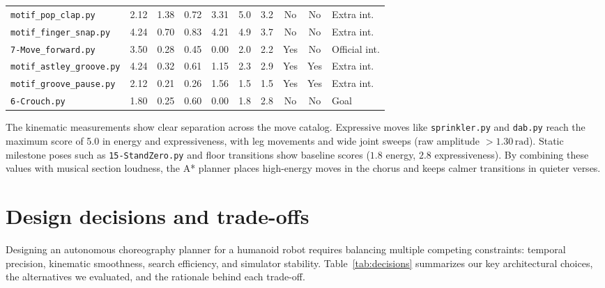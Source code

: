\documentclass[11pt,a4paper]{article}
\newcommand{\code}[1]{\texttt{#1}}
\begin{document}
\begin{table}[H]
\begin{tabular}{l r r r r r r c c l}
    \code{motif\_pop\_clap.py}     &  2.12 & 1.38 & 0.72 & 3.31 & 5.0 & 3.2 & No  & No  & Extra int. \\
    \code{motif\_finger\_snap.py}  &  4.24 & 0.70 & 0.83 & 4.21 & 4.9 & 3.7 & No  & No  & Extra int. \\
    \code{7-Move\_forward.py}      &  3.50 & 0.28 & 0.45 & 0.00 & 2.0 & 2.2 & Yes & No  & Official int. \\
    \code{motif\_astley\_groove.py}&  4.24 & 0.32 & 0.61 & 1.15 & 2.3 & 2.9 & Yes & Yes & Extra int. \\
    \code{motif\_groove\_pause.py} &  2.12 & 0.21 & 0.26 & 1.56 & 1.5 & 1.5 & Yes & Yes & Extra int. \\
    \code{6-Crouch.py}             &  1.80 & 0.25 & 0.60 & 0.00 & 1.8 & 2.8 & No  & No  & Goal \\
    \bottomrule
  \end{tabular}
\end{table}

The kinematic measurements show clear separation across the move catalog. Expressive moves like \code{sprinkler.py} and \code{dab.py} reach the maximum score of 5.0 in energy and expressiveness, with leg movements and wide joint sweeps (raw amplitude $> 1.30\,\text{rad}$). Static milestone poses such as \code{15-StandZero.py} and floor transitions show baseline scores ($1.8$ energy, $2.8$ expressiveness). By combining these values with musical section loudness, the A* planner places high-energy moves in the chorus and keeps calmer transitions in quieter verses.

\clearpage

\section{Design decisions and trade-offs}

Designing an autonomous choreography planner for a humanoid robot requires balancing multiple competing constraints: temporal precision, kinematic smoothness, search efficiency, and simulator stability. Table~\ref{tab:decisions} summarizes our key architectural choices, the alternatives we evaluated, and the rationale behind each trade-off.
\end{document}
